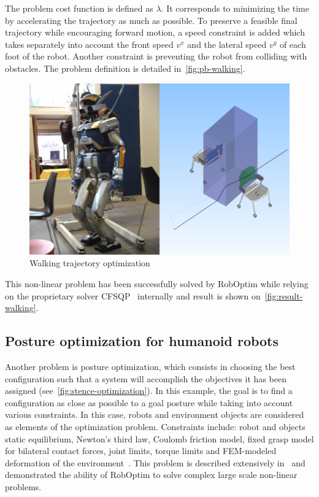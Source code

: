 \documentclass[conference,final,a4paper,twocolumn,9pt]{IEEEtran}
\begin{document}
The problem cost function is defined as $\lambda$. It corresponds to
minimizing the time by accelerating the trajectory as much as
possible. To preserve a feasible final trajectory while encouraging
forward motion, a speed constraint is added which takes separately
into account the front speed $v^x$ and the lateral speed $v^y$ of each
foot of the robot. Another constraint is preventing the robot from
colliding with obstacles. The problem definition is detailed
in~\autoref{fig:pb-walking}.


\begin{figure}[ht!]
  \begin{center}
    \includegraphics[width=\linewidth]{hrp2-two-chairs.png}
    \caption{Walking trajectory optimization\label{fig:result-walking}}
  \end{center}
\end{figure}


This non-linear problem has been successfully solved by RobOptim while
relying on the proprietary solver CFSQP~\cite{cfsqp} internally and
result is shown on~\autoref{fig:result-walking}.


\subsection{Posture optimization for humanoid robots}


Another problem is posture optimization, which consists in choosing
the best configuration such that a system will accomplish the
objectives it has been assigned
(see~\ref{fig:stence-optimization}). In this example, the goal is to
find a configuration as close as possible to a goal posture while
taking into account various constraints. In this case, robots and
environment objects are considered as elements of the optimization
problem. Constraints include: robot and objects static equilibrium,
Newton's third law, Coulomb friction model, fixed grasp model for
bilateral contact forces, joint limits, torque limits and FEM-modeled
deformation of the environment~\cite{Bouyarmane2011b}. This problem is
described extensively in~\cite{Bouyarmane2011a,Bouyarmane2010} and
demonstrated the ability of RobOptim to solve complex large scale
non-linear problems.
\end{document}
